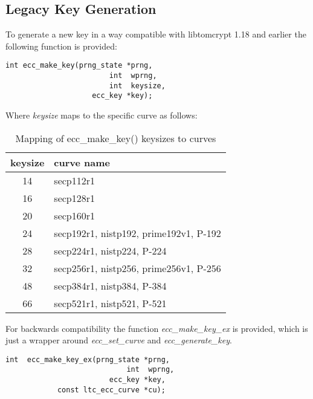 \documentclass[synpaper]{book}
\begin{document}
\subsection{Legacy Key Generation}
To generate a new key in a way compatible with libtomcrypt 1.18 and earlier the following function is provided:

\begin{verbatim}
int ecc_make_key(prng_state *prng,
                        int  wprng,
                        int  keysize,
                    ecc_key *key);
\end{verbatim}

Where \textit{keysize} maps to the specific curve as follows:

\begin{table}[H]
\begin{center}
\begin{tabular}{|c|l|}
      \hline \textbf{keysize} & \textbf{curve name}                    \\
      \hline 14               & secp112r1                              \\
      \hline 16               & secp128r1                              \\
      \hline 20               & secp160r1                              \\
      \hline 24               & secp192r1, nistp192, prime192v1, P-192 \\
      \hline 28               & secp224r1, nistp224, P-224             \\
      \hline 32               & secp256r1, nistp256, prime256v1, P-256 \\
      \hline 48               & secp384r1, nistp384, P-384             \\
      \hline 66               & secp521r1, nistp521, P-521             \\
      \hline
\end{tabular}
\caption{Mapping of ecc\_make\_key() keysizes to curves}
\end{center}
\label{fig:legacy-curve-names}
\end{table}

For backwards compatibility the function \textit{ecc\_make\_key\_ex} is provided, which is just a wrapper
around \textit{ecc\_set\_curve} and \textit{ecc\_generate\_key}.

\begin{verbatim}
int  ecc_make_key_ex(prng_state *prng,
                            int  wprng,
                        ecc_key *key,
            const ltc_ecc_curve *cu);
\end{verbatim}
\end{document}
